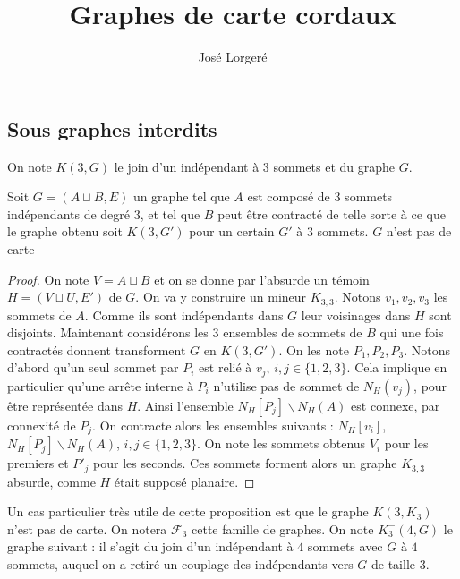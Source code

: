 \documentclass{scrartcl}
\begin{document}
\title{Graphes de carte cordaux}

\author{José Lorgeré}

\maketitle

\begin{flushleft}

\section{Sous graphes interdits}

On note $K(3, G)$ le join d'un indépendant à $3$ sommets et du graphe $G$.

\begin{prop}\label{K3G}
    Soit $G = (A \sqcup B, E)$ un graphe tel que $A$ est composé de $3$ sommets
    indépendants de degré $3$, et tel que $B$ peut être contracté de telle sorte à ce que
    le graphe obtenu soit $K(3, G')$ pour un certain $G'$ à $3$ sommets. $G$ n'est pas de carte
\end{prop}

\begin{proof}
    On note $V = A \sqcup B$ et on se donne par l'absurde un témoin $H = (V \sqcup U, E')$
    de $G$. On va y construire un mineur $K_{3,3}$. Notons $v_1, v_2, v_3$ les sommets de $A$.
    Comme ils sont indépendants dans $G$ leur voisinages dans $H$ sont disjoints.
    \medskip \newline
    Maintenant considérons les $3$ ensembles de sommets de $B$ qui une fois contractés donnent
    transforment $G$ en $K(3, G')$. On les note $P_1, P_2, P_3$. Notons d'abord qu'un seul
    sommet par $P_i$ est relié à $v_j$, $i,j \in \{1, 2, 3\}$. Cela implique en particulier
    qu'une arrête interne à $P_i$ n'utilise pas de sommet de $N_H(v_j)$, pour être représentée
    dans $H$. Ainsi l'ensemble $N_H[P_j] \backslash N_H(A)$ est connexe, par connexité de
    $P_j$.
    \medskip \newline
    On contracte alors les ensembles suivants : $N_H[v_i]$, $N_H[P_j] \backslash N_H(A)$,
    $i,j \in \{1,2,3\}$. On note les sommets obtenus $V_i$ pour les premiers et $P'_j$ pour
    les seconds. Ces sommets forment alors un graphe $K_{3,3}$ absurde, comme $H$ était supposé
    planaire.
\end{proof}

Un cas particulier très utile de cette proposition est que le graphe $K(3, K_3)$ n'est pas
de carte. On notera $\mathcal{F}_3$ cette famille de graphes.
\newline \newline
On note $K^-_3(4, G)$ le graphe suivant : il s'agit du join d'un indépendant à $4$ sommets avec
$G$ à $4$ sommets, auquel on a retiré un couplage des indépendants vers $G$ de taille $3$.


\end{flushleft}
\end{document}
